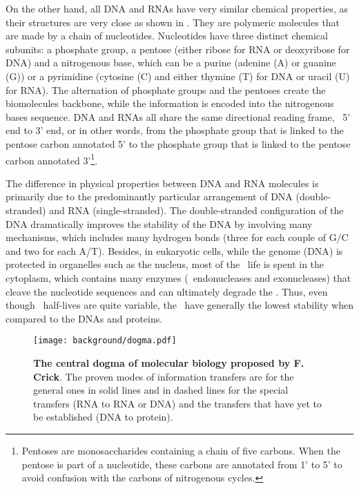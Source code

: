 On the other hand,
all \gls{DNA} and \glspl{RNA} have very similar chemical properties,
as their structures are very close as shown in .
They are polymeric molecules that are made by a chain of nucleotides.
Nucleotides have three distinct chemical subunits: a phosphate group,
a pentose (either ribose for \gls{RNA} or deoxyribose for \gls{DNA})
and a nitrogenous base, which can be a purine (adenine (A) or guanine (G))
or a pyrimidine (cytosine (C) and
either thymine (T) for \gls{DNA} or uracil (U) for \gls{RNA}).
The alternation of phosphate groups and the pentoses create the biomolecules backbone,
while the information is encoded into the nitrogenous bases sequence.
\gls{DNA} and \glspl{RNA} all share the same directional reading frame,
\ie\ 5' end to 3' end, or in other words,
from the phosphate group that is linked to the pentose carbon annotated 5'
to the phosphate group
that is linked to the pentose carbon annotated 3'\footnote{%
Pentoses are monosaccharides containing a chain of five carbons.
When the pentose is part of a nucleotide,
these carbons are annotated from 1' to 5' to avoid confusion
with the carbons of nitrogenous cycles.}.~

The difference in physical properties between \gls{DNA} and
\gls{RNA} molecules is primarily due to
the predominantly particular arrangement of \gls{DNA} (double-stranded) and
\gls{RNA} (single-stranded).
The double-stranded configuration of the \gls{DNA} dramatically improves
the stability of the \gls{DNA} by involving many mechanisms,
which includes many hydrogen bonds
(three for each couple of G/C and two for each A/T).
Besides,
in eukaryotic cells,
while the genome (\gls{DNA}) is protected in organelles such as the nucleus,
most of the \mRNAs\ life is spent in the cytoplasm,
which contains many enzymes (\eg\ endonucleases and exonucleases)
that cleave the nucleotide sequences and can ultimately degrade the \mRNAs.
Thus, even though \mRNAs\ half-lives are quite variable,
the \mRNAs\ have generally the lowest stability
when compared to the \glspl{DNA} and proteins.~

\begin{figure}[!htbp]
    \texttt{[image: background/dogma.pdf]}\centering
    \vspace{-4mm}
    \caption[Central dogma of molecular biology proposed by F. Crick]%
    {\label{fig:dogma}\textbf{The central dogma of molecular biology proposed by
    F. Crick}. The proven modes of information transfers are for the general ones
    in solid lines and in dashed lines for the special transfers
    (\gls{RNA} to \gls{RNA} or \gls{DNA}) and the transfers that have yet to
    be established (\gls{DNA} to protein).
    }
\end{figure}


